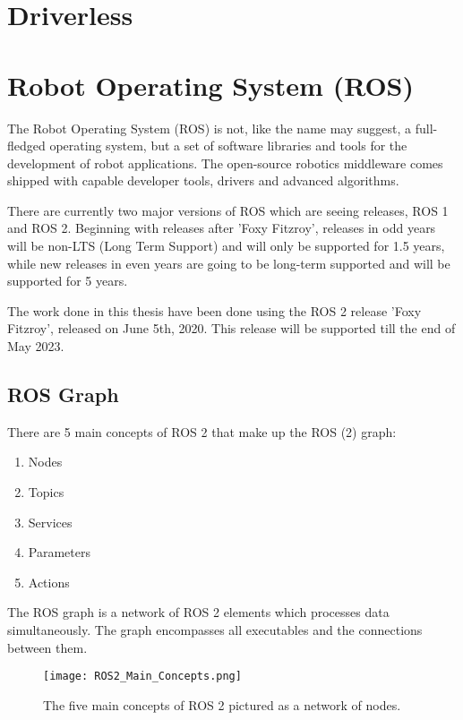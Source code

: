 \section{Driverless}
\lipsum[1]

\section{Robot Operating System (ROS)}
The Robot Operating System (ROS) is not, like the name may suggest, a full-fledged operating system, but a set of software libraries and tools for the development of robot applications. The open-source robotics middleware comes shipped with capable developer tools, drivers and advanced algorithms. \cite{ros2_documentation}

There are currently two major versions of ROS which are seeing releases, ROS 1 and ROS 2. \cite{ros2_distributions} Beginning with releases after 'Foxy Fitzroy', releases in odd years will be non-LTS (Long Term Support) and will only be supported for 1.5 years, while new releases in even years are going to be long-term supported and will be supported for 5 years. \cite{ros2_releases_and_target_platforms}

The work done in this thesis have been done using the ROS 2 release 'Foxy Fitzroy', released on June 5th, 2020. This release will be supported till the end of May 2023. \cite{ros2_distributions}

\subsection{ROS Graph}
There are 5 main concepts of ROS 2 that make up the ROS (2) graph:
\begin{enumerate}
    \item Nodes
    \item Topics
    \item Services
    \item Parameters
    \item Actions
\end{enumerate}

The ROS graph is a network of ROS 2 elements which processes data simultaneously. The graph encompasses all executables and the connections between them.

\begin{figure}[H]
    \centering
    \texttt{[image: ROS2\_Main\_Concepts.png]}
    \caption{The five main concepts of ROS 2 pictured as a network of nodes.}
    \label{fig:ROS 2 main concepts}
\end{figure}

